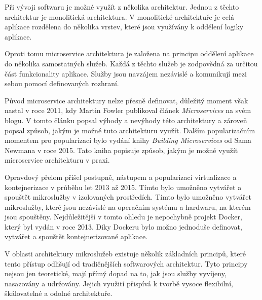 


Při vývoji softwaru je možné využít z několika architektur. Jednou z těchto architektur je monolitická architektura. V monolitické architektuře je celá aplikace rozdělena do několika vrstev, které jsou využívány k oddělení logiky aplikace.

Oproti tomu microservice architektura je založena na principu oddělení aplikace do několika samostatných služeb. Každá z těchto služeb je zodpovědná za určitou část funkcionality aplikace. Služby jsou navzájem nezávislé a komunikují mezi sebou pomocí definovaných rozhraní. \cite{Richardson2018}


Původ microservice architektury nelze přesně definovat, důležitý moment však nastal v roce 2011, kdy Martin Fowler publikoval článek \textit{Microservices} na svém blogu. V tomto článku popsal výhody a nevýhody této architektury a zároveň popsal způsob, jakým je možné tuto architekturu využít. Dalším popularizačním momentem pro popularizaci bylo vydání knihy \textit{Building Microservices} od Sama Newmana v roce 2015. Tato kniha popisuje způsob, jakým je možné využít microservice architekturu v praxi.

Opravdový přelom přišel postupně, nástupem a popularizací virtualizace a kontejnerizace v průběhu let 2013 až 2015. Tímto bylo umožněno vytvářet a spouštět mikroslužby v izolovaných prostředích. Tímto bylo umožněno vytvářet mikroslužby, které jsou nezávislé na operačním systému a hardwaru, na kterém jsou spouštěny. Nejdůležitější v tomto ohledu je nepochybně projekt Docker, který byl vydán v roce 2013. Díky Dockeru bylo možno jednoduše definovat, vytvářet a spouštět kontejnerizované aplikace.


V oblasti architektury mikroslužeb existuje několik základních principů, které tento přístup odlišují od tradičnějších softwarových architektur. Tyto principy nejsou jen teoretické, mají přímý dopad na to, jak jsou služby vyvíjeny, nasazovány a udržovány. Jejich využití přispívá k tvorbě vysoce flexibilní, škálovatelné a odolné architektuře.


